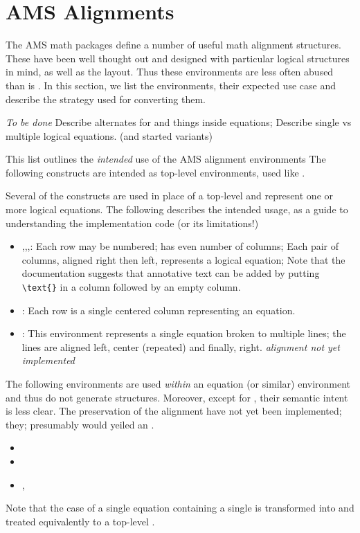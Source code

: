 \documentclass{book}
\begin{document}
\section{AMS Alignments}\label{amsalign}
The AMS math packages define a number of useful math alignment structures.
These have been well thought out and designed with particular logical
structures in mind, as well as the layout. Thus these environments are
less often abused than is .  In this section, we list
the environments, their expected use case and describe the strategy used
for converting them.

\emph{To be done}
Describe alternates for  and things inside equations;
Describe single vs multiple logical equations.
(and started variants)

This list outlines the \emph{intended} use of the AMS alignment environments
The following constructs are intended as top-level environments, used like .

Several of the constructs are used in place of a top-level 
and represent one or more logical equations.  The following describes
the intended usage, as a guide to understanding the implementation code (or its limitations!)
\begin{itemize}
\item {},,,:
  Each row may be numbered; has even number of columns;
  Each pair of columns, aligned right then left, represents a logical equation;
  Note that the documentation suggests that annotative text can be added
  by putting \verb|\text{}| in a column followed by an empty column.  
\item {}:
  Each row is a single centered column representing an equation.
\item {}:
  This environment represents a single equation broken to multiple lines;
  the lines are aligned left, center (repeated) and finally, right.
  \emph{alignment not yet implemented}
\end{itemize}
The following environments are used \emph{within} an equation (or similar)
environment and thus do not generate  structures.
Moreover, except for , their semantic intent is less clear.
The preservation of the alignment have not yet been implemented;
they; presumably would yeiled an .
\begin{itemize}
\item {}
\item {}
\item {},
\end{itemize}
Note that the case of a single equation containing a single 
is transformed into and treated equivalently to a top-level .
\end{document}
